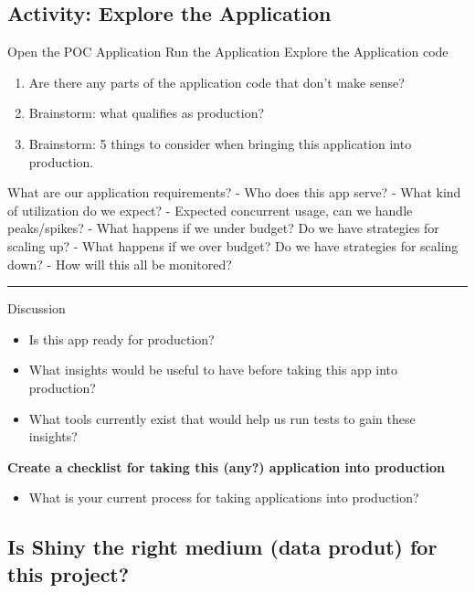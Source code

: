 \documentclass[]{book}
\providecommand{\tightlist}{%
  \setlength{\itemsep}{0pt}\setlength{\parskip}{0pt}}
\theoremstyle{definition}
\theoremstyle{definition}
\theoremstyle{definition}
\theoremstyle{remark}
\begin{document}
\hypertarget{activity-explore-the-application}{%
\subsection{Activity: Explore the
Application}\label{activity-explore-the-application}}

Open the POC Application Run the Application Explore the Application
code

\begin{enumerate}
\def\labelenumi{\arabic{enumi}.}
\tightlist
\item
  Are there any parts of the application code that don't make sense?
\item
  Brainstorm: what qualifies as production?
\item
  Brainstorm: 5 things to consider when bringing this application into
  production.
\end{enumerate}

What are our application requirements? - Who does this app serve? - What
kind of utilization do we expect? - Expected concurrent usage, can we
handle peaks/spikes? - What happens if we under budget? Do we have
strategies for scaling up? - What happens if we over budget? Do we have
strategies for scaling down? - How will this all be monitored?

\begin{center}\rule{0.5\linewidth}{\linethickness}\end{center}

Discussion

\begin{itemize}
\tightlist
\item
  Is this app ready for production?
\item
  What insights would be useful to have before taking this app into
  production?
\item
  What tools currently exist that would help us run tests to gain these
  insights?
\end{itemize}

\textbf{Create a checklist for taking this (any?) application into
production}

\begin{itemize}
\tightlist
\item
  What is your current process for taking applications into production?
\end{itemize}

\hypertarget{is-shiny-the-right-medium-data-produt-for-this-project}{%
\subsection{Is Shiny the right medium (data produt) for this
project?}\label{is-shiny-the-right-medium-data-produt-for-this-project}}
\end{document}
